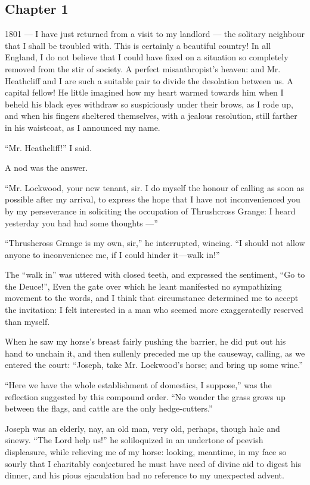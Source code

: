 \subsection*{Chapter 1}

\par 1801 — I have just returned from a visit to my landlord — the solitary neighbour that I shall be troubled with. This is certainly a beautiful country! In all England, I do not believe that I could have fixed on a situation so completely removed from the stir of society. A perfect misanthropist's heaven: and Mr. Heathcliff and I are such a suitable pair to divide the desolation between us. A capital fellow! He little imagined how my heart warmed towards him when I beheld his black eyes withdraw so suspiciously under their brows, as I rode up, and when his fingers sheltered themselves, with a jealous resolution, still farther in his waistcoat, as I announced my name.
\par “Mr. Heathcliff!” I said.
\par A nod was the answer.
\par “Mr. Lockwood, your new tenant, sir. I do myself the honour of calling as soon as possible after my arrival, to express the hope that I have not inconvenienced you by my perseverance in soliciting the occupation of Thrushcross Grange: I heard yesterday you had had some thoughts —”
\par “Thrushcross Grange is my own, sir,” he interrupted, wincing. “I should not allow anyone to inconvenience me, if I could hinder it—walk in!”
\par The “walk in” was uttered with closed teeth, and expressed the sentiment, “Go to the Deuce!”, Even the gate over which he leant manifested no sympathizing movement to the words, and I think that circumstance determined me to accept the invitation: I felt interested in a man who seemed more exaggeratedly reserved than myself.
\par When he saw my horse's breast fairly pushing the barrier, he did put out his hand to unchain it, and then sullenly preceded me up the causeway, calling, as we entered the court: “Joseph, take Mr. Lockwood's horse; and bring up some wine.”
\par “Here we have the whole establishment of domestics, I suppose,” was the reflection suggested by this compound order. “No wonder the grass grows up between the flags, and cattle are the only hedge-cutters.”
\par Joseph was an elderly, nay, an old man, very old, perhaps, though hale and sinewy. “The Lord help us!” he soliloquized in an undertone of peevish displeasure, while relieving me of my horse: looking, meantime, in my face so sourly that I charitably conjectured he must have need of divine aid to digest his dinner, and his pious ejaculation had no reference to my unexpected advent.
